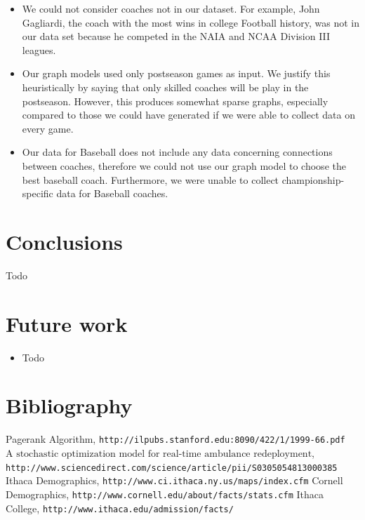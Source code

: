 \documentclass[titlepage]{article}
\begin{document}
\begin{itemize}
\item We could not consider coaches not in our dataset. For example, John Gagliardi, the coach with the most wins in college Football history, was not in our data set because he competed in the NAIA and NCAA Division III leagues. 

\item Our graph models used only postseason games as input. We justify this heuristically by saying that only skilled coaches will be play in the postseason. However, this produces somewhat sparse graphs, especially compared to those we could have generated if we were able to collect data on every game.

\item Our data for Baseball does not include any data concerning connections between coaches, therefore we could not use our graph model to choose the best baseball coach. Furthermore, we were unable to collect championship-specific data for Baseball coaches.
\end{itemize}

\section{Conclusions}
Todo

\section{Future work}
\begin{itemize}
\item Todo
\end{itemize}

\pagebreak

\section{Bibliography}
\begin{thebibliography}{9}

 Pagerank Algorithm,
\verb|http://ilpubs.stanford.edu:8090/422/1/1999-66.pdf|
 $\text{A stochastic optimization model for real-time ambulance redeployment}$,
\\\verb|http://www.sciencedirect.com/science/article/pii/S0305054813000385|
 Ithaca Demographics,
\verb|http://www.ci.ithaca.ny.us/maps/index.cfm|
 Cornell Demographics,
\verb|http://www.cornell.edu/about/facts/stats.cfm|
 Ithaca College,
\verb|http://www.ithaca.edu/admission/facts/|


\end{thebibliography}
\end{document}
